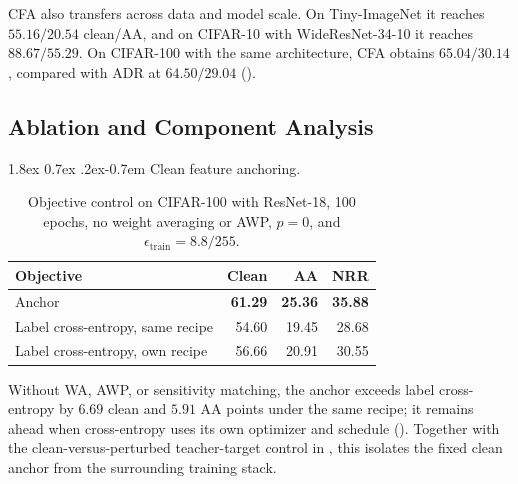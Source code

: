 \documentclass{article} %
\makeatletter
\theoremstyle{plain}
\renewcommand{\paragraph}{\@startsection{paragraph}{4}{\z@}%
  {1.8ex \@plus 0.7ex \@minus .2ex}{-0.7em}%
  {\normalfont\normalsize\bfseries}}
\makeatother
\begin{document}
CFA also transfers across data and model scale. On Tiny-ImageNet it reaches
\(55.16/20.54\) clean/AA, and on CIFAR-10 with WideResNet-34-10 it reaches
\(88.67/55.29\). On CIFAR-100 with the same architecture, CFA obtains
\(65.04/30.14\), compared with ADR at \(64.50/29.04\)
().

\subsection{Ablation and Component Analysis}
\label{sec:components}
\paragraph{Clean feature anchoring.}
\begin{table}[!htbp]
  \centering
  \small
  \setlength{\tabcolsep}{5pt}
  \caption{
  Objective control on CIFAR-100 with ResNet-18, 100 epochs, no weight
  averaging or AWP, \(p=0\), and
  \(\epsilon_{\mathrm{train}}=8.8/255\).
  }
  \label{tab:controls}
  \begin{tabular}{lrrr}
    \toprule
    Objective & Clean & AA & NRR \\
    \midrule
    Anchor
      & \textbf{61.29} & \textbf{25.36} & \textbf{35.88} \\
    Label cross-entropy, same recipe
      & 54.60 & 19.45 & 28.68 \\
    Label cross-entropy, own recipe
      & 56.66 & 20.91 & 30.55 \\
    \bottomrule
  \end{tabular}
\end{table}

Without WA, AWP, or sensitivity matching, the anchor exceeds label
cross-entropy by \(6.69\) clean and \(5.91\) AA points under the same recipe;
it remains ahead when cross-entropy uses its own optimizer and schedule
(). Together with the clean-versus-perturbed teacher-target
control in , this isolates the fixed clean anchor from the
surrounding training stack.
\end{document}
